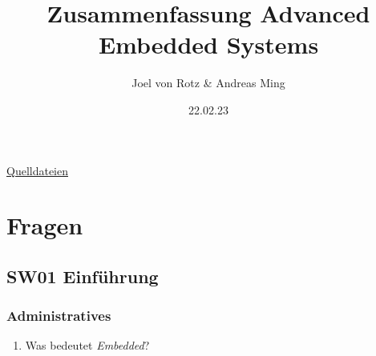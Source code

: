 \documentclass[
  10pt,
  a4paper,
]{article}
\title{Zusammenfassung Advanced Embedded Systems}
\author{Joel von Rotz \& Andreas Ming}
\date{22.02.23}
\providecommand{\tightlist}{%
  \setlength{\itemsep}{0pt}\setlength{\parskip}{0pt}}\usepackage{longtable,booktabs,array}
\numberwithin{equation}{section}
\renewcommand*\contentsname{Inhaltsverzeichnis}
\newcommand\contentsname{Inhaltsverzeichnis}
\begin{document}

\makeatletter
\begin{center}
  \vspace*{0.5cm}
  
  \textbf{\Huge \@title}
  
  \vspace{0.1cm}

  {\Large {\@author \hspace{4.8cm} \@date}}
  
  \vspace{0.5cm}

\end{center}
\makeatother

\begin{center}
{\large \faGithub\space \href{https://www.youtube.com/watch?v=dQw4w9WgXcQ}{Quelldateien}}
\end{center}




\ifdefined\Shaded\renewenvironment{Shaded}{\begin{tcolorbox}[colback={shadecolor}, boxrule=0pt, frame hidden, enhanced, breakable]}{\end{tcolorbox}}\fi\ifdefined\Shaded\renewenvironment{Shaded}{\begin{tcolorbox}[enhanced, boxrule=0pt, colback={shadecolor}, breakable, frame hidden]}{\end{tcolorbox}}\fi

\renewcommand*\contentsname{Inhaltsverzeichnis}
{
\hypersetup{linkcolor=}
\setcounter{tocdepth}{3}
\tableofcontents
}
\hypertarget{fragen}{%
\section{Fragen}\label{fragen}}

\hypertarget{sw01-einfuxfchrung}{%
\subsection{SW01 Einführung}\label{sw01-einfuxfchrung}}

\hypertarget{administratives}{%
\subsubsection{Administratives}\label{administratives}}

\begin{enumerate}
\def\labelenumi{\arabic{enumi}.}
\tightlist
\item
  Was bedeutet \emph{Embedded}?
\end{enumerate}
\end{document}
